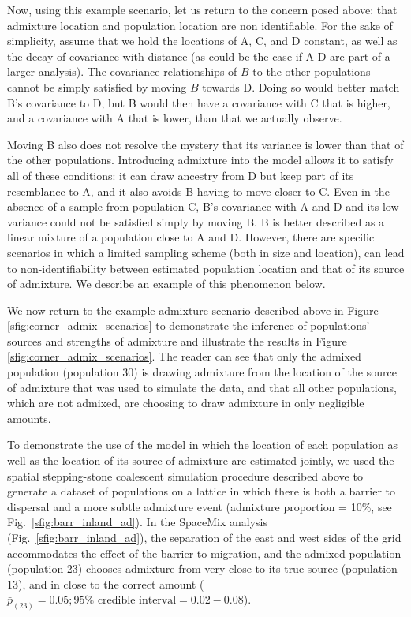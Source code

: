 \documentclass[12pt]{article}
\begin{document}
Now, using this example scenario, let us return to the concern posed above: that admixture location and population location are non identifiable.  For the sake of simplicity, assume that we hold the locations of A, C, and D constant, as well as the decay of covariance with distance (as could be the case if A-D are part of a larger analysis).  The covariance relationships of $B$ to the other populations cannot be simply satisfied by moving $B$ towards D. Doing so would better match B's covariance to D, but B would then have a covariance with C that is higher, and a covariance with A that is lower, than that we actually observe. 

Moving B also does not resolve the mystery that its variance is lower than that of the other populations. Introducing admixture into the model allows it to satisfy all of these conditions: it can draw ancestry from D but keep part of its resemblance to A, and it also avoids B having to move closer to C. Even in the absence of a sample from population C, B's covariance with A and D and its low variance could not be satisfied simply by moving B.  B is better described as a linear mixture of a population close to A and D.  However, there are specific scenarios in which a limited sampling scheme (both in size and location), can lead to non-identifiability between estimated population location and that of its source of admixture.  We describe an example of this phenomenon below.

We now return to the example admixture scenario described above in Figure \ref{sfig:corner_admix_scenarios} to demonstrate the inference of populations' sources and strengths of admixture and illustrate the results in Figure \ref{sfig:corner_admix_scenarios}.  The reader can see that only the admixed population (population 30) is drawing admixture from the location of the source of admixture that was used to simulate the data, and that all other populations, which are not admixed, are choosing to draw admixture in only negligible amounts.

To demonstrate the use of the model in which the location of each population as well as the location of its source of admixture are estimated jointly, we used the spatial stepping-stone coalescent simulation procedure described above to generate a dataset of populations on a lattice in which there is both a barrier to dispersal and a more subtle admixture event (admixture proportion = 10\%, see Fig.\ \ref{sfig:barr_inland_ad}).  In the SpaceMix analysis (Fig.\ \ref{sfig:barr_inland_ad}), the separation of the east and west sides of the grid accommodates the effect of the barrier to migration, and the admixed population (population 23) chooses admixture from very close to its true source (population 13), and in close to the correct amount ($\bar{p}_{(23)} = 0.05; 95\% \text{ credible interval} = 0.02-0.08$). 
\end{document}
